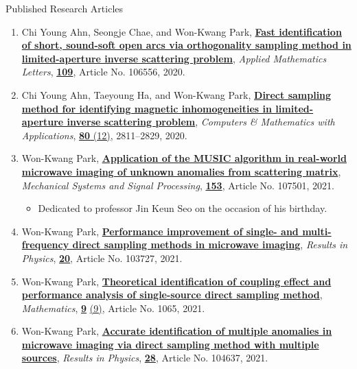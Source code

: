 \documentclass{resume} %
\begin{document}
\begin{rSection}{Published Research Articles}
\begin{enumerate}
\item\label{A-AML2020} Chi Young Ahn, Seongje Chae, and Won-Kwang Park, \href{https://doi.org/10.1016/j.aml.2020.106556}{\textbf{Fast identification of short, sound-soft open arcs via orthogonality sampling method in limited-aperture inverse scattering problem}}, \textit{Applied Mathematics Letters}, \href{https://www.sciencedirect.com/science/journal/08939659/109/supp/C}{\textbf{109}}, Article No. 106556, 2020.
\item\label{A-CAMWA2020} Chi Young Ahn, Taeyoung Ha, and Won-Kwang Park, \href{https://doi.org/10.1016/j.camwa.2020.10.009}{\textbf{Direct sampling method for identifying magnetic inhomogeneities in limited-aperture inverse scattering problem}}, \textit{Computers \& Mathematics with Applications}, \href{https://www.sciencedirect.com/journal/computers-and-mathematics-with-applications/vol/80/issue/12}{\textbf{80} (12)}, 2811--2829, 2020.
\item\label{A-MSSP2021} Won-Kwang Park, \href{https://doi.org/10.1016/j.ymssp.2020.107501}{\textbf{Application of the MUSIC algorithm in real-world microwave imaging of unknown anomalies from scattering matrix}}, \textit{Mechanical Systems and Signal Processing}, \href{https://www.sciencedirect.com/journal/mechanical-systems-and-signal-processing/vol/153/suppl/C}{\textbf{153}}, Article No. 107501, 2021.
    \begin{itemize}
      \item Dedicated to professor Jin Keun Seo on the occasion of his  birthday.
    \end{itemize}
\item\label{A-RINP2021A} Won-Kwang Park, \href{https://doi.org/10.1016/j.rinp.2020.103727}{\textbf{Performance improvement of single- and multi-frequency direct sampling methods in microwave imaging}}, \textit{Results in Physics}, \href{https://www.sciencedirect.com/journal/results-in-physics/vol/20/suppl/C}{\textbf{20}}, Article No. 103727, 2021.
\item\label{A-MATH2021A} Won-Kwang Park, \href{https://doi.org/10.3390/math9091065}{\textbf{Theoretical identification of coupling effect and performance analysis of single-source direct sampling method}}, \textit{Mathematics}, \href{https://www.mdpi.com/2227-7390/9}{\textbf{9}} \href{https://www.mdpi.com/2227-7390/9/9}{(9)}, Article No. 1065, 2021.
\item\label{A-RINP2021B} Won-Kwang Park, \href{https://doi.org/10.1016/j.rinp.2021.104637}{\textbf{Accurate identification of multiple anomalies in microwave imaging via direct sampling method with multiple sources}}, \textit{Results in Physics}, \href{https://www.sciencedirect.com/journal/results-in-physics/vol/28/suppl/C}{\textbf{28}}, Article No. 104637, 2021.

\end{enumerate}
\end{rSection}
\end{document}
